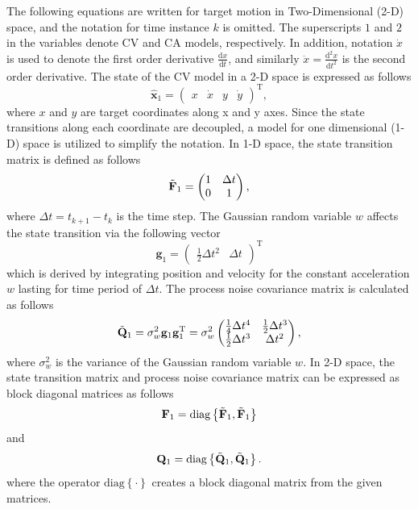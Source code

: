 \documentclass[english, 12pt, a4paper, elec, utf8, a-1b, online]{aaltothesis}
\numberwithin{equation}{section}
\renewcommand{\vec}[1]{\mathbf{#1}}
\newcommand{\transpose}[1]{#1^\text{T}}
\newcommand{\dt}{\Delta t}
\newcommand{\diag}[1]{\text{diag}\left\{ #1 \right\}}
\begin{document}
The following equations are written for target motion in Two-Dimensional (2-D) space, and
the notation for time instance $k$ is omitted.
The superscripts $1$ and $2$ in the variables denote CV and CA models, respectively. 
In addition, notation $\dot{x}$ is used to denote the first order derivative $\frac{\text{d} x}{\text{d} t}$, and similarly $\ddot{x}=\frac{\text{d}^2 x}{\text{d} t^2}$ is the second order derivative.
The state of the CV model in a 2-D space is expressed as follows
\begin{equation}\label{eq:x_mode1}
    \hat{\mathbf{x}}_1 =
        \transpose{
        \begin{pmatrix}
            x & \dot{x} & y & \dot{y}
    \end{pmatrix}},
\end{equation}
where $x$ and $y$ are target coordinates along x and y axes. 
Since the state transitions along each coordinate are decoupled, a model for one dimensional (1-D) space is utilized to simplify the notation.
In 1-D space, the state transition matrix is defined as follows
\begin{equation}\label{eq:f_mode1}
    \Tilde{\vec{F}}_1 =
    \begin{pmatrix}
        1 & \dt \\
        0 & 1  \\
    \end{pmatrix},
\end{equation}
where $\dt=t_{k+1} - t_k$ is the time step.
The Gaussian random variable $w$ affects the state transition via the following vector
\begin{equation}\label{eq:g_noise_mode1}
\vec{g}_1 =\transpose{\begin{pmatrix}
        \frac{1}{2} \dt^2 & \dt
    \end{pmatrix}}
\end{equation}
which is derived by integrating position and velocity for the constant acceleration $w$ lasting for time period of $\dt$.
The process noise covariance matrix is calculated as follows  
\begin{equation}
    \Tilde{\vec{Q}}_1 = \sigma_w^2 \vec{g}_1 \transpose{\vec{g}_1}
    = \sigma_w^2
    \begin{pmatrix}
        \frac{1}{4} \dt^4 & \frac{1}{2} \dt^3 \\ 
        \frac{1}{2} \dt^3 & \dt^2 \\ 
    \end{pmatrix},
\end{equation}
where $\sigma_w^2$ is the variance of the Gaussian random variable $w$.
In 2-D space, the state transition matrix and process noise covariance matrix can be expressed as block diagonal matrices as follows 
\begin{equation}\label{eq:F_mode1}
\vec{F}_1 = \diag{\Tilde{\vec{F}}_1, \Tilde{\vec{F}}_1}
\end{equation}
and
\begin{equation}
    \vec{Q}_1 = \diag{\Tilde{\vec{Q}}_1, \Tilde{\vec{Q}}_1}.
\end{equation}
where the operator $\diag{\cdot}$ creates a block diagonal matrix from the given matrices.
\end{document}
